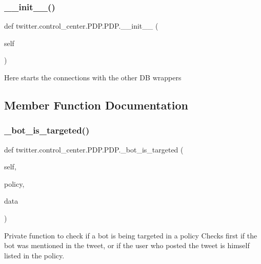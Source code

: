 \subsubsection{\texorpdfstring{\+\_\+\+\_\+init\+\_\+\+\_\+()}{\_\_init\_\_()}}
{\footnotesize\ttfamily def twitter.\+control\+\_\+center.\+P\+D\+P.\+P\+D\+P.\+\_\+\+\_\+init\+\_\+\+\_\+ (\begin{DoxyParamCaption}\item[{}]{self }\end{DoxyParamCaption})}

\begin{DoxyVerb}Here starts the connections with the other DB wrappers
\end{DoxyVerb}
 

\subsection{Member Function Documentation}
\mbox{\label{classtwitter_1_1control__center_1_1PDP_1_1PDP_a302067b5d102cbe2a5f55355bb204333}} 
\subsubsection{\texorpdfstring{\+\_\+bot\+\_\+is\+\_\+targeted()}{\_bot\_is\_targeted()}}
{\footnotesize\ttfamily def twitter.\+control\+\_\+center.\+P\+D\+P.\+P\+D\+P.\+\_\+bot\+\_\+is\+\_\+targeted (\begin{DoxyParamCaption}\item[{}]{self,  }\item[{}]{policy,  }\item[{}]{data }\end{DoxyParamCaption})\hspace{0.3cm}{\ttfamily [private]}}



Private function to check if a bot is being targeted in a policy Checks first if the bot was mentioned in the tweet, or if the user who posted the tweet is himself listed in the policy. 



